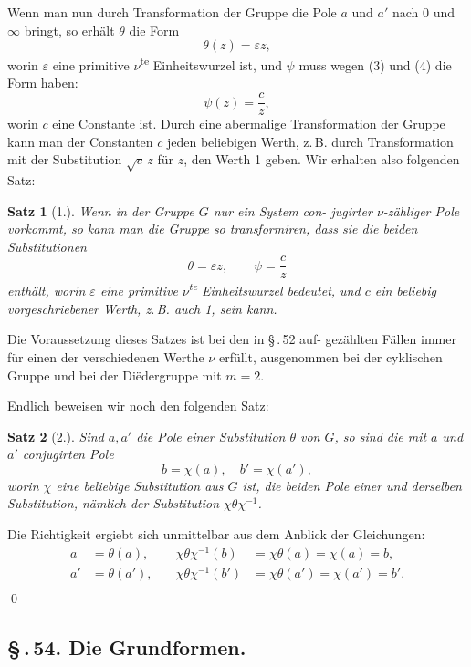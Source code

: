 \documentclass[12pt,a4paper]{article}
\theoremstyle{plain}
\newtheorem{satz}{Satz}[section]
\theoremstyle{definition}
\theoremstyle{remark}
\newcommand{\sect}[1]{\S\,.\,#1.}
\begin{document}
Wenn man nun durch Transformation der Gruppe die Pole
$a$ und $a'$ nach $0$ und $\infty$ bringt, so erh\"alt $\theta$ die Form
\[
\theta(z) = \varepsilon z,
\]
worin $\varepsilon$ eine primitive $\nu$\textsuperscript{te} Einheitswurzel ist, und $\psi$ muss wegen
(3) und (4) die Form haben:
\[
\psi(z) = \frac{c}{z},
\]
worin $c$ eine Constante ist. Durch eine abermalige Transformation
der Gruppe kann man der Constanten $c$ jeden beliebigen Werth,
z.\,B. durch Transformation mit der Substitution $\sqrt{c}\,z$ f\"ur $z$, den
Werth 1 geben. Wir erhalten also folgenden Satz:

\begin{satz}[1.]
Wenn in der Gruppe $G$ nur ein System con-
jugirter $\nu$-z\"ahliger Pole vorkommt, so kann man
die Gruppe so transformiren, dass sie die beiden
Substitutionen
\[
\theta = \varepsilon z,\qquad \psi = \frac{c}{z}
\]
enth\"alt, worin $\varepsilon$ eine primitive $\nu$\textsuperscript{te} Einheitswurzel
bedeutet, und $c$ ein beliebig vorgeschriebener
Werth, z.\,B. auch 1, sein kann.
\end{satz}

Die Voraussetzung dieses Satzes ist bei den in \S\,.\,52 auf-
gez\"ahlten F\"allen immer f\"ur einen der verschiedenen Werthe $\nu$
erf\"ullt, ausgenommen bei der cyklischen Gruppe und bei der
Di\"edergruppe mit $m = 2$.

Endlich beweisen wir noch den folgenden Satz:

\begin{satz}[2.]
Sind $a, a'$ die Pole einer Substitution $\theta$ von $G$,
so sind die mit $a$ und $a'$ conjugirten Pole
\[
b = \chi(a),\quad b' = \chi(a'),
\]
worin $\chi$ eine beliebige Substitution aus $G$ ist, die
beiden Pole einer und derselben Substitution,
n\"amlich der Substitution $\chi\theta\chi^{-1}$.
\end{satz}

Die Richtigkeit ergiebt sich unmittelbar aus dem Anblick
der Gleichungen:
\begin{align*}
a &= \theta(a),\quad &\chi\theta\chi^{-1}(b) &= \chi\theta(a) = \chi(a) = b,\\
a' &= \theta(a'),\quad &\chi\theta\chi^{-1}(b') &= \chi\theta(a') = \chi(a') = b'.\\[-1em]
\end{align*}
\qed


\subsection*{\sect{54} Die Grundformen.}
\end{document}
